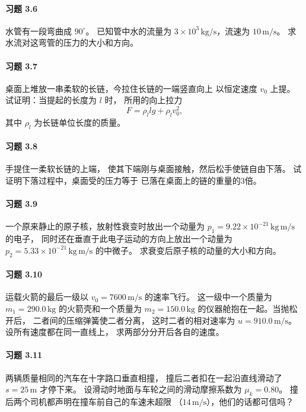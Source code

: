 \paragraph{习题 3.6}
水管有一段弯曲成 \(90^\circ\)。
已知管中水的流量为
\(3\times10^3\,\mathrm{kg/s}\)，流速为
\(10\,\mathrm{m/s}\)。
求水流对这弯管的压力的大小和方向。

\paragraph{习题 3.7}
桌面上堆放一串柔软的长链，今拉住长链的一端竖直向上
以恒定速度 \(v_0\) 上提。
试证明：当提起的长度为 \(l\) 时，
所用的向上拉力
\[
 F=\rho_l lg+\rho_l v_0^2,
\]
其中 \(\rho_l\) 为长链单位长度的质量。

\paragraph{习题 3.8}
手提住一柔软长链的上端，
使其下端刚与桌面接触，然后松手使链自由下落。
试证明下落过程中，桌面受的压力等于
已落在桌面上的链的重量的3倍。

\paragraph{习题 3.9}
一个原来静止的原子核，放射性衰变时放出一个动量为
\(p_1=9.22\times10^{-21}\,\mathrm{kg\,m/s}\) 的电子，
同时还在垂直于此电子运动的方向上放出一个动量为
\(p_2=5.33\times10^{-21}\,\mathrm{kg\,m/s}\) 的中微子。
求衰变后原子核的动量的大小和方向。

\paragraph{习题 3.10}
运载火箭的最后一级以
\(v_0=7600\,\mathrm{m/s}\) 的速率飞行。
这一级中一个质量为 \(m_1=290.0\,\mathrm{kg}\)
的火箭壳和一个质量为 \(m_2=150.0\,\mathrm{kg}\)
的仪器舱抱在一起。当抛松开后，
二者间的压缩弹簧使二者分离，
这时二者的相对速率为
\(u=910.0\,\mathrm{m/s}\)。
设所有速度都在同一直线上，
求两部分分开后各自的速度。

\paragraph{习题 3.11}
两辆质量相同的汽车在十字路口垂直相撞，
撞后二者扣在一起沿直线滑动了
\(s=25\,\mathrm m\) 才停下来。
设滑动时地面与车轮之间的滑动摩擦系数为
\(\mu_k=0.80\)。
撞后两个司机都声明在撞车前自己的车速未超限
（\(14\,\mathrm{m/s}\)），他们的话都可信吗？

